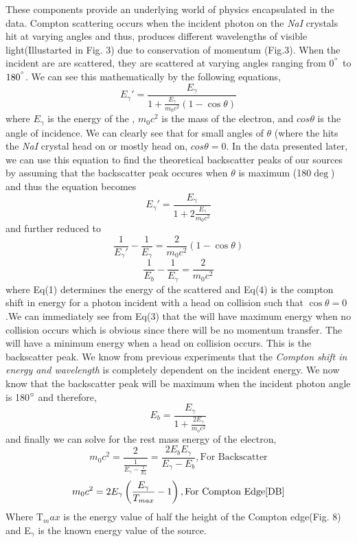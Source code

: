\documentclass[%
 reprint,
 amsmath,amssymb,
 aps,
]{revtex4-1}
\begin{document}
These components provide an underlying world of physics encapsulated in the data. Compton scattering occurs when the incident photon on the \textit{NaI} crystals hit at varying angles and thus, produces different wavelengths of visible light(Illustarted in Fig. 3) due to conservation of momentum (Fig.3). When the incident \gp are are scattered, they are scattered at varying angles ranging from 0$^{\degree}$ to $180^{\degree}$. We can see this mathematically by the following equations\cite{SBH}, 
\begin{equation}
E_{\gamma}' = \frac{E_{\gamma}}{1 + \frac{E_{\gamma}}{m_0 c^2} (1 - \cos{\theta}) }
\end{equation}
where $E_\gamma$ is the energy of the \gp, $m_0c^2$ is the mass of the electron, and $cos\theta$ is the angle of incidence. We can clearly see that for small angles of $\theta$ (where the \gp hits the \textit{NaI} crystal head on or mostly head on, $cos\theta = 0$. In the data presented later, we can use this equation to find the theoretical backscatter peaks of our sources by assuming that the backscatter peak occures when $\theta$ is maximum (180$\deg$) and thus the equation becomes 
\begin{equation}
E_{\gamma}' = \frac{E_{\gamma}}{1 + 2\frac{E_{\gamma}}{m_0 c^2}}
\end{equation}
and further reduced to
\begin{equation}
\frac{1}{E_{\gamma}'} - \frac{1}{E_{\gamma}} = \frac{2}{m_0 c^2}(1 - \cos{\theta})
\end{equation}
\begin{equation}
\frac{1}{E_{b}} - \frac{1}{E_{\gamma}} = \frac{2}{m_0 c^2}
\end{equation}
where Eq(1) determines the energy of the scattered \gp and Eq(4) is the compton shift in energy for a photon incident with a head on collision such that $\cos{\theta} = 0$.We can immediately see from Eq(3) that the \gp will have maximum energy when no collision occurs which is obvious since there will be no momentum transfer. The \gp will have a minimum energy when a head on collision occurs. This is the backscatter peak. We know from previous experiments that the \textit{Compton shift in energy and wavelength}\cite{DB} is completely dependent on the incident \gp energy. We now know that the backscatter peak will be maximum when the incident photon angle is 180$\degree$ and therefore,
\begin{equation}
E_b = \frac{E_{\gamma}}{ 1 + \frac{2E_{\gamma}}{m_oc^2}}
\end{equation}
and finally we can solve for the rest mass energy of the electron,
\begin{equation}
m_0c^2 = \frac{2}{\frac{1}{E_{\gamma} - \frac{1}{E_{b}}}} = \frac{2E_{b}E_{\gamma}}{E_{\gamma} - E_b}, \text{For Backscatter}
\end{equation}
\begin{equation}
m_0c^2 =2E_{\gamma}\left(\frac{E_{\gamma}}{T_{max}} - 1\right ), \text{For Compton Edge\cite{DB}}
\end{equation}
Where T$_max$ is the energy value of half the height of the Compton edge(Fig. 8) and E$_\gamma$ is the known energy value of the source.
\end{document}
